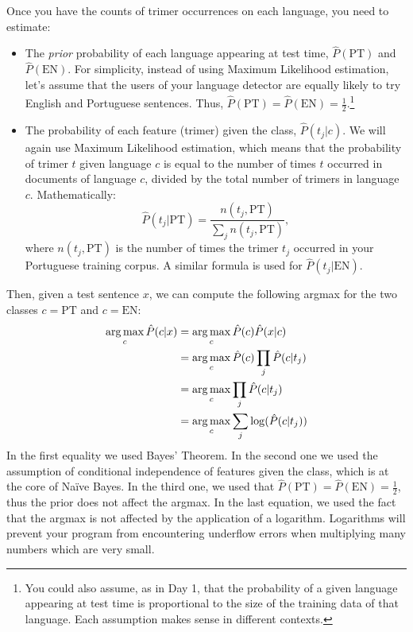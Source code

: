 Once you have the counts of trimer occurrences on each language, you need to estimate:
\begin{itemize}
	\item The \emph{prior} probability of each language appearing at test time, ${\hat P}(\text{PT})$ and ${\hat P}(\text{EN})$. For simplicity, instead of using Maximum Likelihood estimation, let's assume that the users of your language detector are equally likely to try English and Portuguese sentences. Thus, ${\hat P}(\text{PT}) = {\hat P}(\text{EN}) = \frac{1}{2}$.\footnote{You could also assume, as in Day 1, that the probability of a given language appearing at test time is proportional to the size of the training data of that language. Each assumption makes sense in different contexts.}
	\item The probability of each feature (trimer) given the class, ${\hat P}(t_j | c)$. We will again use Maximum Likelihood estimation, which means that the probability of trimer $t$ given language $c$ is equal to the number of times $t$ occurred in documents of language $c$, divided by the total number of trimers in language $c$. Mathematically:
\begin{equation}
{\hat P}(t_j|\text{PT}) = \frac{n(t_j,\text{PT})}{\sum_j n(t_j,\text{PT})},
\end{equation}
where $n(t_j,\text{PT})$ is the number of times the trimer $t_j$ occurred in your Portuguese training corpus. A similar formula is used for ${\hat P}(t_j|\text{EN})$.
\end{itemize}

Then, given a test sentence $x$, we can compute the following argmax for the two classes $c = \text{PT}$ and $c = \text{EN}$:
%
\begin{eqnarray}
\operatorname*{arg\,max}_c {\hat P}(c | x) &= \operatorname*{arg\,max}_c {\hat P}(c) {\hat P}(x | c) \nonumber\\
&= \operatorname*{arg\,max}_c {\hat P}(c) \prod_j {\hat P}(c | t_j) \nonumber\\
&= \operatorname*{arg\,max}_c \prod_j {\hat P}(c | t_j) \nonumber\\
&= \operatorname*{arg\,max}_c \sum_j \log({\hat P}(c | t_j))\label{eq:NBformula}
\end{eqnarray}
%
In the first equality we used Bayes' Theorem. In the second one we used the assumption of conditional independence of features given the class, which is at the core of Na\"{i}ve Bayes. In the third one, we used that ${\hat P}(\text{PT}) = {\hat P}(\text{EN}) = \frac{1}{2}$, thus the prior does not affect the argmax. In the last equation, we used the fact that the argmax is not affected by the application of a logarithm. Logarithms will prevent your program from encountering underflow errors when multiplying many numbers which are very small.


